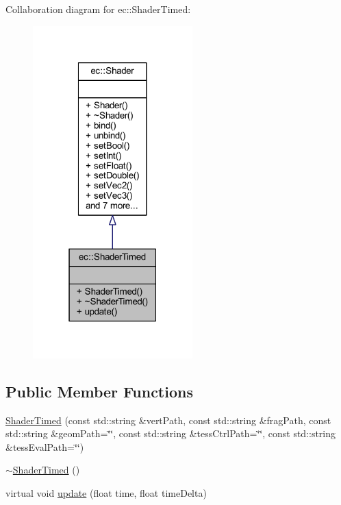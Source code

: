 Collaboration diagram for ec\+:\+:Shader\+Timed\+:\nopagebreak
\begin{figure}[H]
\begin{center}
\leavevmode
\includegraphics[width=175pt]{classec_1_1_shader_timed__coll__graph}
\end{center}
\end{figure}
\subsection*{Public Member Functions}
\begin{DoxyCompactItemize}
\item 
\mbox{\hyperlink{classec_1_1_shader_timed_ae02144800facf155732c2c38d8d64297}{Shader\+Timed}} (const std\+::string \&vert\+Path, const std\+::string \&frag\+Path, const std\+::string \&geom\+Path=\char`\"{}\char`\"{}, const std\+::string \&tess\+Ctrl\+Path=\char`\"{}\char`\"{}, const std\+::string \&tess\+Eval\+Path=\char`\"{}\char`\"{})
\item 
\mbox{\hyperlink{classec_1_1_shader_timed_aa0f0ed52039ab46266010bcf9c2131fb}{$\sim$\+Shader\+Timed}} ()
\item 
virtual void \mbox{\hyperlink{classec_1_1_shader_timed_abaeaa76b098bc4602075da0ad8b7284a}{update}} (float time, float time\+Delta)
\end{DoxyCompactItemize}



